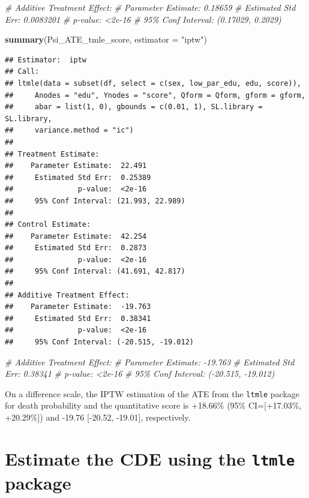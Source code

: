 \documentclass[
]{book}
\newenvironment{Shaded}{\begin{snugshade}}{\end{snugshade}}
\newcommand{\AttributeTok}[1]{\textcolor[rgb]{0.13,0.29,0.53}{#1}}
\newcommand{\CommentTok}[1]{\textcolor[rgb]{0.56,0.35,0.01}{\textit{#1}}}
\newcommand{\FunctionTok}[1]{\textcolor[rgb]{0.13,0.29,0.53}{\textbf{#1}}}
\newcommand{\NormalTok}[1]{#1}
\newcommand{\StringTok}[1]{\textcolor[rgb]{0.31,0.60,0.02}{#1}}
\begin{document}
\begin{Shaded}
\begin{Highlighting}[]
\CommentTok{\# Additive Treatment Effect:}
\CommentTok{\#    Parameter Estimate:  0.18659 }
\CommentTok{\#     Estimated Std Err:  0.0083201 }
\CommentTok{\#               p{-}value:  \textless{}2e{-}16 }
\CommentTok{\#     95\% Conf Interval: (0.17029, 0.2029) }

\FunctionTok{summary}\NormalTok{(Psi\_ATE\_tmle\_score, }\AttributeTok{estimator =} \StringTok{"iptw"}\NormalTok{)}
\end{Highlighting}
\end{Shaded}

\begin{verbatim}
## Estimator:  iptw 
## Call:
## ltmle(data = subset(df, select = c(sex, low_par_edu, edu, score)), 
##     Anodes = "edu", Ynodes = "score", Qform = Qform, gform = gform, 
##     abar = list(1, 0), gbounds = c(0.01, 1), SL.library = SL.library, 
##     variance.method = "ic")
## 
## Treatment Estimate:
##    Parameter Estimate:  22.491 
##     Estimated Std Err:  0.25389 
##               p-value:  <2e-16 
##     95% Conf Interval: (21.993, 22.989) 
## 
## Control Estimate:
##    Parameter Estimate:  42.254 
##     Estimated Std Err:  0.2873 
##               p-value:  <2e-16 
##     95% Conf Interval: (41.691, 42.817) 
## 
## Additive Treatment Effect:
##    Parameter Estimate:  -19.763 
##     Estimated Std Err:  0.38341 
##               p-value:  <2e-16 
##     95% Conf Interval: (-20.515, -19.012)
\end{verbatim}

\begin{Shaded}
\begin{Highlighting}[]
\CommentTok{\# Additive Treatment Effect:}
\CommentTok{\#    Parameter Estimate:  {-}19.763 }
\CommentTok{\#     Estimated Std Err:  0.38341 }
\CommentTok{\#               p{-}value:  \textless{}2e{-}16 }
\CommentTok{\#     95\% Conf Interval: ({-}20.515, {-}19.012) }
\end{Highlighting}
\end{Shaded}

On a difference scale, the IPTW estimation of the ATE from the \texttt{ltmle} package for death probability and the quantitative score is +18.66\% (95\% CI={[}+17.03\%, +20.29\%{]}) and -19.76 {[}-20.52, -19.01{]}, respectively.

\chapter{\texorpdfstring{Estimate the CDE using the \texttt{ltmle} package}{Estimate the CDE using the ltmle package}}\label{estimate-the-cde-using-the-ltmle-package}
\end{document}
